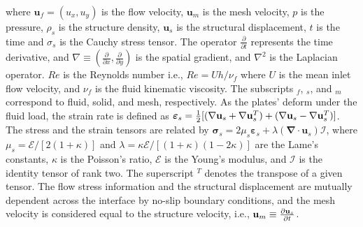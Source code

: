 \documentclass[%
 aip,
 amsmath,amssymb,
 reprint,
]{revtex4-1}
\begin{document}
where $\mathbf{u}_f=(u_x,u_y)$ is the flow velocity, $\mathbf{u}_m$ is the mesh velocity, $p$ is the pressure, $\rho_s$ is the structure density, $\mathbf{u}_s$ is the structural displacement, $t$ is the time and $\sigma_s$ is the Cauchy stress tensor. The operator $\frac{\partial}{\partial t}$ represents the time derivative, and $\nabla\equiv\left(\frac{\partial}{\partial x},\frac{\partial}{\partial y}\right)$ is the spatial gradient, and $\nabla^2$ is the Laplacian operator. $Re$ is the Reynolds number i.e., $Re=Uh/\nu_f$ where $U$ is the mean inlet flow velocity, and $\nu_f$ is the fluid kinematic viscosity. The subscripts $_f$, $_s$, and $_m$ correspond to fluid, solid, and mesh, respectively. As the plates' deform under the fluid load, the strain rate is defined as $\boldsymbol{\varepsilon}_s={1\over2}[(\mathbf{\nabla}\mathbf{u}_s+\mathbf{\nabla}\mathbf{u}_s^T)+(\mathbf{\nabla}\mathbf{u}_s - \mathbf{\nabla}\mathbf{u}_s^T)]$. The stress and the strain tensors are related by $\boldsymbol{\sigma}_s=2\mu_s \boldsymbol{\varepsilon}_s+\lambda( \mathbf{\nabla}\cdot\mathbf{u}_s)\mathcal{I}$, where $\mu_s=\mathcal{E}/[2(1+\kappa)]$ and $\lambda=\kappa \mathcal{E}/[(1+\kappa)(1-2\kappa)]$ are the Lame's constants, $\kappa$ is the Poisson's ratio, $\mathcal{E}$ is the Young's modulus, and $\mathcal{I}$ is the identity tensor of rank two. The superscript $^T$ denotes the transpose of a given tensor. The flow stress information and the structural displacement are mutually dependent across the interface by no-slip boundary conditions, and the mesh velocity is considered equal to the structure velocity, i.e., $\mathbf{u}_m\equiv {\partial\mathbf{u}_s\over\partial t}$.
 
\end{document}
